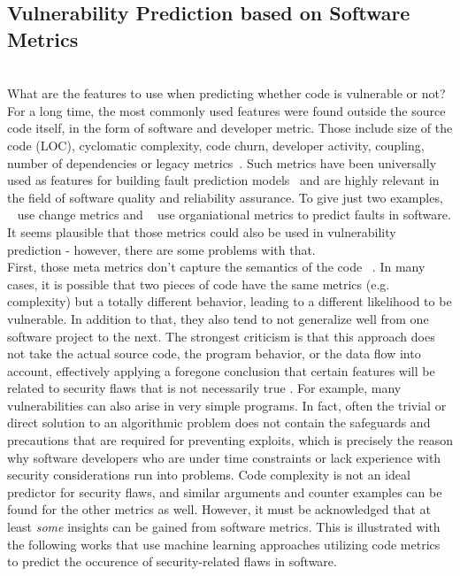 \documentclass[
	a4paper,
	pagesize,
	pdftex,
	12pt,
	twoside, %
	BCOR=5mm, %
	ngerman,
	fleqn,
	final,
	]{scrartcl}
\begin{document}
\subsection{Vulnerability Prediction based on Software Metrics}\mbox{}\\
What are the features to use when predicting whether code is vulnerable or not? For a long time, the most commonly used features were found outside the source code itself, in the form of software and developer metric. Those include size of the code (LOC), cyclomatic complexity, code churn, developer activity, coupling, number of dependencies or legacy metrics~\cite{Morrison.2015}. Such metrics have been universally used as features for building fault prediction models~\cite{Hall.2011} and are highly relevant in the field of software quality and reliability assurance.  To give just two examples, ~\cite{ACM.2008b} use change metrics and ~\cite{Nagappan.2008} use organiational metrics to predict faults in software. It seems plausible that those metrics could also be used in vulnerability prediction - however, there are some problems with that.\\
First, those meta metrics don't capture the semantics of the code ~\cite{Shin.2008}. In many cases, it is possible that two pieces of code have the same metrics (e.g. complexity) but a totally different behavior, leading to a different likelihood to be vulnerable. In addition to that, they also tend to not generalize well from one software project to the next. The strongest criticism is that this approach does not take the actual source code, the program behavior, or the data flow into account, effectively applying a foregone conclusion that certain features will be related to security flaws that is not necessarily true \citep{Hovsepyan.2012}. For example, many vulnerabilities can also arise in very simple programs. In fact, often the trivial or direct solution to an algorithmic problem does not contain the safeguards and precautions that are required for preventing exploits, which is precisely the reason why software developers who are under time constraints or lack experience with security considerations run into problems. Code complexity is not an ideal predictor for security flaws, and similar arguments and counter examples can be found for the other metrics as well. However, it must be acknowledged that at least \textit{some} insights can be gained from software metrics. This is illustrated with the following works that use machine learning approaches utilizing code metrics to predict the occurence of security-related flaws in software.\\
\end{document}
